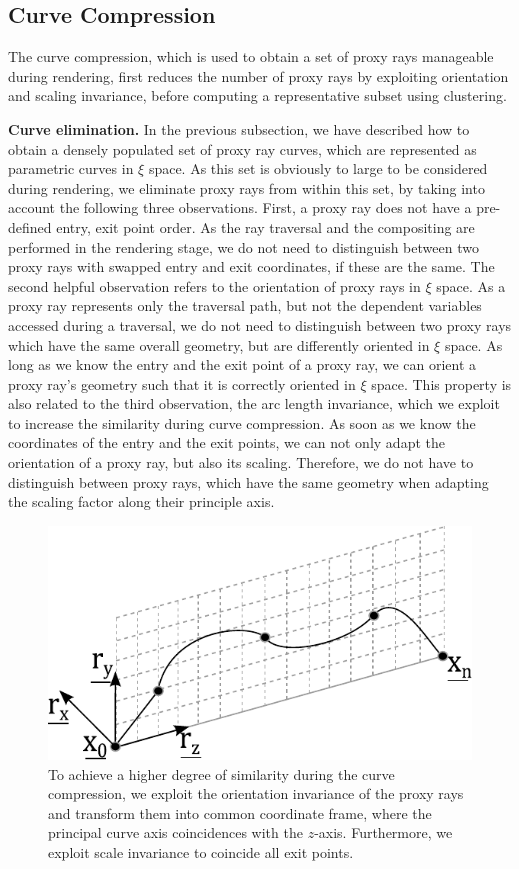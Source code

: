 \documentclass[review,journal]{vgtc}         %
\begin{document}
\subsection{Curve Compression}\label{subsec:curvecompression}

The curve compression, which is used to obtain a set of proxy rays manageable during rendering, first reduces the number of proxy rays by exploiting orientation and scaling invariance, before computing a representative subset using clustering.

\noindent \textbf{Curve elimination.} In the previous subsection, we have described how to obtain a densely populated set of proxy ray curves, which are represented as parametric curves in $\xi$ space. As this set is obviously to large to be considered during rendering, we eliminate proxy rays from within this set, by taking into account the following three observations. First, a proxy ray does not have a pre-defined entry, exit point order. As the ray traversal and the compositing are performed in the rendering stage, we do not need to distinguish between two proxy rays with swapped entry and exit coordinates, if these are the same. The second helpful observation refers to the orientation of proxy rays in $\xi$ space. As a proxy ray represents only the traversal path, but not the dependent variables accessed during a traversal, we do not need to distinguish between two proxy rays which have the same overall geometry, but are differently oriented in $\xi$ space. As long as we know the entry and the exit point of a proxy ray, we can orient a proxy ray's geometry such that it is correctly oriented in $\xi$ space. This property is also related to the third observation, the arc length invariance, which we exploit to increase the similarity during curve compression. As soon as we know the coordinates of the entry and the exit points, we can not only adapt the orientation of a proxy ray, but also its scaling. Therefore, we do not have to distinguish between proxy rays, which have the same geometry when adapting the scaling factor along their principle axis.


\begin{figure}[b]
	\centering
	\includegraphics[width=0.75\linewidth]{figures/splinetransformation}
	\caption{To achieve a higher degree of similarity during the curve compression, we exploit the orientation invariance of the proxy rays and transform them into common coordinate frame, where the principal curve axis coincidences with the $z$-axis. Furthermore, we exploit scale invariance to coincide all exit points.}
	\label{fig:proxyrayalignment}
\end{figure}
\end{document}
